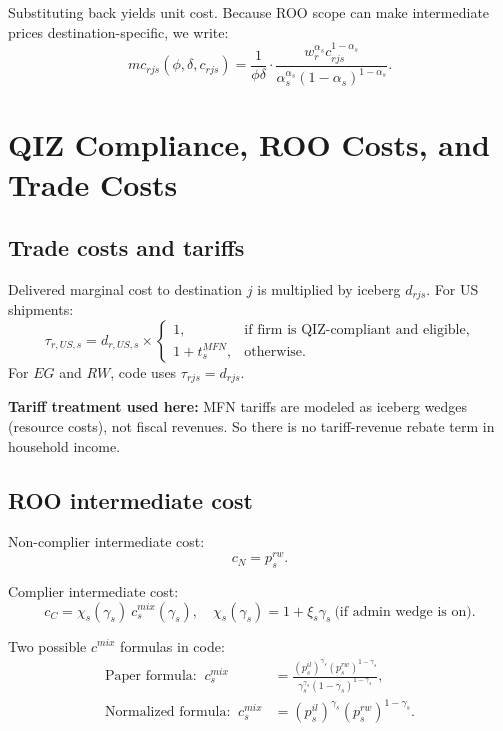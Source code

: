 \documentclass[11pt]{article}
\begin{document}
Substituting back yields unit cost. Because ROO scope can make intermediate prices destination-specific, we write:
\begin{equation}
mc_{rjs}(\phi,\delta,c_{rjs})
= \frac{1}{\phi\delta}\cdot
\frac{w_r^{\alpha_s} c_{rjs}^{1-\alpha_s}}
{\alpha_s^{\alpha_s}(1-\alpha_s)^{1-\alpha_s}}.
\label{eq:mc}
\end{equation}

\section{QIZ Compliance, ROO Costs, and Trade Costs}
\subsection{Trade costs and tariffs}
Delivered marginal cost to destination $j$ is multiplied by iceberg $d_{rjs}$.
For US shipments:
\begin{equation}
\tau_{r,US,s} =
d_{r,US,s}\times
\begin{cases}
1, & \text{if firm is QIZ-compliant and eligible},\\
1+t^{MFN}_s, & \text{otherwise}.
\end{cases}
\end{equation}
For $EG$ and $RW$, code uses $\tau_{rjs}=d_{rjs}$.

\textbf{Tariff treatment used here:} MFN tariffs are modeled as iceberg wedges (resource costs), not fiscal revenues.
So there is no tariff-revenue rebate term in household income.

\subsection{ROO intermediate cost}
Non-complier intermediate cost:
\[
c_N = p^{rw}_s.
\]

Complier intermediate cost:
\begin{equation}
c_C = \chi_s(\gamma_s)\ c^{mix}_s(\gamma_s),
\quad
\chi_s(\gamma_s)=1+\xi_s\gamma_s \ \text{(if admin wedge is on)}.
\end{equation}

Two possible $c^{mix}$ formulas in code:
\begin{align}
\text{Paper formula: }\
c^{mix}_s &=
\frac{(p^{il}_s)^{\gamma_s}(p^{rw}_s)^{1-\gamma_s}}
{\gamma_s^{\gamma_s}(1-\gamma_s)^{1-\gamma_s}},\\
\text{Normalized formula: }\
c^{mix}_s &=
(p^{il}_s)^{\gamma_s}(p^{rw}_s)^{1-\gamma_s}.
\end{align}
\end{document}
